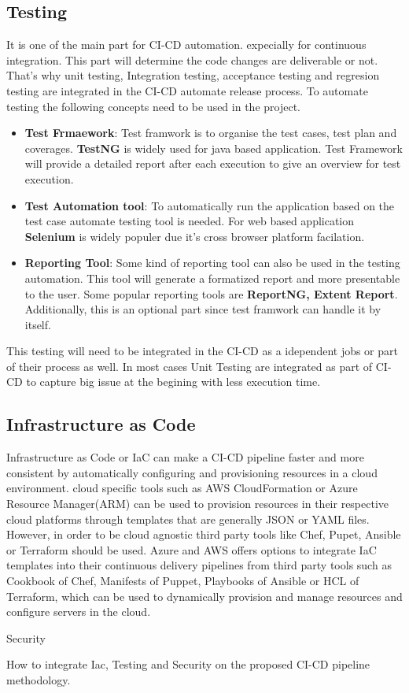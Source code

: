 \subsection{Testing}
It is one of the main part for CI-CD automation. expecially for continuous integration. This part will determine the code changes are deliverable or not. That's why unit testing, Integration testing, acceptance testing and regresion testing are integrated in the CI-CD automate release process. To automate testing the following concepts need to be used in the project.
\begin{itemize}
	\item \textbf{Test Frmaework}: Test framwork is to organise the test cases, test plan and coverages. \textbf{TestNG} is widely used for java based application. Test Framework will provide a detailed report after each execution to give an overview for test execution.
	\item \textbf{Test Automation tool}: To automatically run the application based on the test case automate testing tool is needed. For web based application \textbf{Selenium} is widely populer due it's cross browser platform facilation.
	\item \textbf{Reporting Tool}: Some kind of reporting tool can also be used in the testing automation. This tool will generate a formatized report and more presentable to the user. Some popular reporting tools are \textbf{ReportNG, Extent Report}. Additionally, this is an optional part since test framwork can handle it by itself.
\end{itemize}
This testing will need to be integrated in the CI-CD as a idependent jobs or part of their process as well. In most cases Unit Testing are integrated as part of CI-CD to capture big issue at the begining with less execution time.

\subsection{Infrastructure as Code}
Infrastructure as Code or IaC can make a CI-CD pipeline faster and more consistent by automatically configuring and provisioning resources in a cloud environment. cloud specific tools such as AWS CloudFormation or Azure Resource Manager(ARM) can be used to provision resources in their respective cloud platforms through templates that are generally JSON or YAML files. However, in order to be cloud agnostic third party tools like Chef, Pupet, Ansible or Terraform should be used. Azure and AWS offers options to integrate IaC templates into their continuous delivery pipelines from third party tools such as Cookbook of Chef, Manifests of Puppet, Playbooks of Ansible or HCL of Terraform, which can be used to dynamically provision and manage resources and configure servers in the cloud. 

Security

How to integrate Iac, Testing and Security on the proposed CI-CD pipeline methodology.
